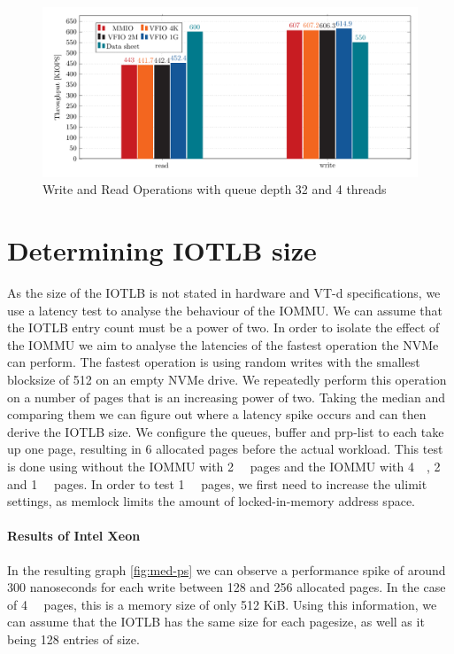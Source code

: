 \begin{figure}
    \centering
    \includegraphics[width=\textwidth]{figures/throughputqd32t1singlepage}
    \caption{Write and Read Operations with queue depth 32 and 4 threads}
    \label{fig:iopsq32t1sp}
\end{figure}

\section{Determining IOTLB size}
As the size of the IOTLB is not stated in hardware and VT-d specifications, we use a latency test to analyse the behaviour of the IOMMU. We can assume that the IOTLB entry count must be a power of two. In order to isolate the effect of the IOMMU we aim to analyse the latencies of the fastest operation the NVMe can perform. The fastest operation is using random writes with the smallest blocksize of \qty{512}{\byte} on an empty NVMe drive. We repeatedly perform this operation on a number of pages that is an increasing power of two. Taking the median and comparing them we can figure out where a latency spike occurs and can then derive the IOTLB size. We configure the queues, buffer and prp-list to each take up one page, resulting in 6 allocated pages before the actual workload. This test is done using without the IOMMU with \qty{2}{\mebi\byte} pages and the IOMMU with \qty{4}{\kibi\byte}, \qty{2}{\mebi\byte} and \qty{1}{\gibi\byte} pages. In order to test \qty{1}{\gibi\byte} pages, we first need to increase the ulimit settings, as memlock limits the amount of locked-in-memory address space.

\paragraph{Results of Intel Xeon}

In the resulting graph \autoref{fig:med-ps} we can observe a performance spike of around 300 nanoseconds for each write between 128 and 256 allocated pages. In the case of \qty{4}{\kibi\byte} pages, this is a memory size of only 512 KiB. Using this information, we can assume that the IOTLB has the same size for each pagesize, as well as it being 128 entries of size.

